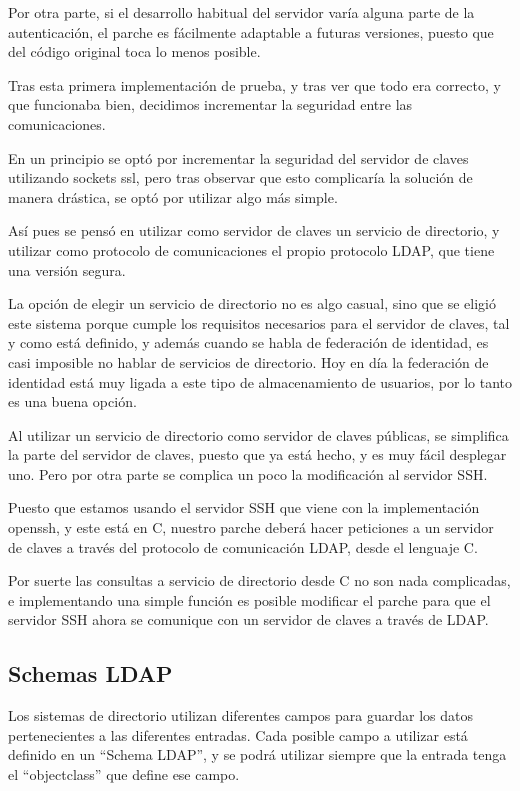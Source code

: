     Por otra parte, si el desarrollo habitual del servidor varía alguna
    parte de la autenticación, el parche es fácilmente adaptable a futuras
    versiones, puesto que del código original toca lo menos posible.

    Tras esta primera implementación de prueba, y tras ver que todo era
    correcto, y que funcionaba bien, decidimos incrementar la seguridad
    entre las comunicaciones.

    En un principio se optó por incrementar la seguridad del servidor de
    claves utilizando sockets ssl, pero tras observar que esto complicaría
    la solución de manera drástica, se optó por utilizar algo más simple.

    Así pues se pensó en utilizar como servidor de claves un servicio de
    directorio, y utilizar como protocolo de comunicaciones el propio
    protocolo LDAP, que tiene una versión segura.

    La opción de elegir un servicio de directorio no es algo casual, sino
    que se eligió este sistema porque cumple los requisitos necesarios para
    el servidor de claves, tal y como está definido, y además cuando se
    habla de federación de identidad, es casi imposible no hablar de
    servicios de directorio. Hoy en día la federación de identidad está muy
    ligada a este tipo de almacenamiento de usuarios, por lo tanto es una
    buena opción.

    Al utilizar un servicio de directorio como servidor de claves públicas,
    se simplifica la parte del servidor de claves, puesto que ya está
    hecho, y es muy fácil desplegar uno. Pero por otra parte se complica un
    poco la modificación al servidor SSH.

    Puesto que estamos usando el servidor SSH que viene con la
    implementación openssh, y este está en C, nuestro parche deberá hacer
    peticiones a un servidor de claves a través del protocolo de
    comunicación LDAP, desde el lenguaje C.

    Por suerte las consultas a servicio de directorio desde C no son nada
    complicadas, e implementando una simple función es posible modificar el
    parche para que el servidor SSH ahora se comunique con un servidor de
    claves a través de LDAP.

    \subsection{Schemas LDAP}

    Los sistemas de directorio utilizan diferentes campos para guardar los
    datos pertenecientes a las diferentes entradas. Cada posible campo a
    utilizar está definido en un ``Schema LDAP'', y se podrá utilizar
    siempre que la entrada tenga el ``objectclass'' que define ese campo.

